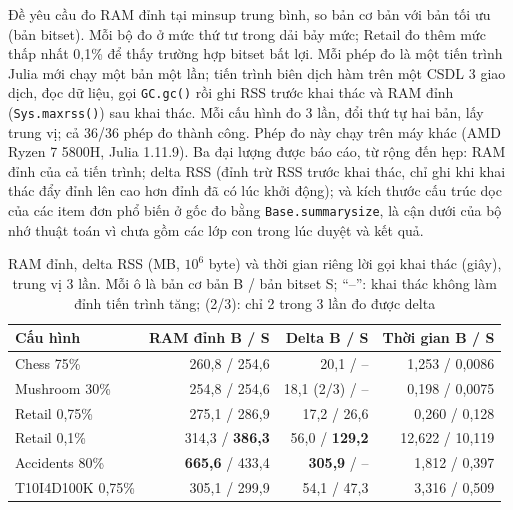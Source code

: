 Đề yêu cầu đo RAM đỉnh tại minsup trung bình, so bản cơ bản với bản tối ưu (bản bitset). Mỗi bộ đo ở mức thứ tư trong dải
bảy mức; Retail đo thêm mức thấp nhất 0,1\% để thấy trường hợp bitset bất lợi. Mỗi phép đo là một tiến trình
Julia mới chạy một bản một lần; tiến trình biên dịch hàm trên một CSDL 3 giao dịch, đọc dữ liệu, gọi
\texttt{GC.gc()} rồi ghi RSS trước khai thác và RAM đỉnh (\texttt{Sys.maxrss()}) sau khai thác. Mỗi cấu hình đo
3 lần, đổi thứ tự hai bản, lấy trung vị; cả 36/36 phép đo thành công. Phép đo này chạy trên máy khác (AMD Ryzen 7
5800H, Julia 1.11.9). Ba đại lượng được báo cáo, từ rộng đến hẹp: RAM đỉnh của cả tiến trình; delta RSS (đỉnh
trừ RSS trước khai thác, chỉ ghi khi khai thác đẩy đỉnh lên cao hơn đỉnh đã có lúc khởi động); và kích thước
cấu trúc dọc của các item đơn phổ biến ở gốc đo bằng \texttt{Base.summarysize}, là cận dưới của bộ nhớ thuật
toán vì chưa gồm các lớp con trong lúc duyệt và kết quả.

\begin{table}[t]
\caption{RAM đỉnh, delta RSS (MB, $10^6$ byte) và thời gian riêng lời gọi khai thác (giây), trung vị 3 lần.
Mỗi ô là bản cơ bản B / bản bitset S; ``--'': khai thác không làm đỉnh tiến trình tăng; (2/3): chỉ 2 trong 3
lần đo được delta}
\label{tab:memory}
\centering
\footnotesize
\setlength{\tabcolsep}{2.5pt}
\begin{tabular}{@{}lrrr@{}}
\toprule
Cấu hình & RAM đỉnh B / S & Delta B / S & Thời gian B / S \\
\midrule
Chess 75\% & 260,8 / 254,6 & 20,1 / -- & 1,253 / 0,0086 \\
Mushroom 30\% & 254,8 / 254,6 & 18,1 (2/3) / -- & 0,198 / 0,0075 \\
Retail 0,75\% & 275,1 / 286,9 & 17,2 / 26,6 & 0,260 / 0,128 \\
Retail 0,1\% & 314,3 / \textbf{386,3} & 56,0 / \textbf{129,2} & 12,622 / 10,119 \\
Accidents 80\% & \textbf{665,6} / 433,4 & \textbf{305,9} / -- & 1,812 / 0,397 \\
T10I4D100K 0,75\% & 305,1 / 299,9 & 54,1 / 47,3 & 3,316 / 0,509 \\
\bottomrule
\end{tabular}
\end{table}

